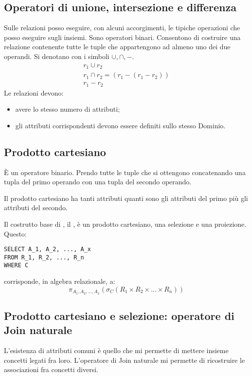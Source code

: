 \subsection{Operatori di unione, intersezione e differenza}

Sulle relazioni posso eseguire, con alcuni accorgimenti, le tipiche operazioni che posso eseguire sugli insiemi. Sono operatori binari. Consentono di costruire una relazione contenente tutte le tuple che appartengono ad almeno uno dei due operandi. Si denotano con i simboli $\cup, \cap, -$.
\begin{gather*}
r_1 \cup r_2 \\
r_1 \cap r_2 = \left( r_1 - \left( r_1 - r_2 \right)\right) \\
r_1 - r_2 
\end{gather*}
Le relazioni devono:
\begin{itemize}
    \item avere lo stesso numero di attributi;
    \item gli attributi corrispondenti devono essere definiti sullo stesso Dominio.
\end{itemize} 

\subsection{Prodotto cartesiano}

\`E un operatore binario. Prendo tutte le tuple che si ottengono concatenando una tupla del primo operando con una tupla del secondo operando.

Il prodotto cartesiano ha tanti attributi quanti sono gli attributi del primo pi\`u gli attributi del secondo.

Il costrutto base di , il , \`e un prodotto cartesiano, una selezione e una proiezione. Questo:
\begin{lstlisting}
SELECT A_1, A_2, ..., A_x
FROM R_1, R_2, ..., R_n
WHERE C
\end{lstlisting}
corrisponde, in algebra relazionale, a: 
\[
\pi_{A_1, A_2, \dots, A_x} \left( \sigma_{C} \left( R_1 \times R_2 \times \dots \times R_n \right) \right)
\]

\subsection{Prodotto cartesiano e selezione: operatore di Join naturale}

L'esistenza di attributi comuni \`e quello che mi permette di mettere insieme concetti legati fra loro. L'operatore di Join naturale mi permette di ricostruire le associazioni fra concetti diversi.

